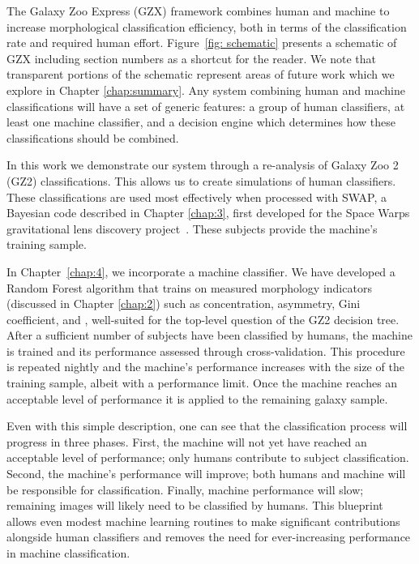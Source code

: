 
The Galaxy Zoo Express (GZX) framework combines human and machine to increase morphological classification efficiency, both in terms of the classification rate and required human effort. Figure~\ref{fig: schematic} presents a schematic of GZX including section numbers as a shortcut for the reader. We note that transparent portions  of the schematic represent areas of future work which we explore in Chapter \ref{chap:summary}. Any system combining human and machine classifications will have a set of generic features: a group of human classifiers, at least one machine classifier, and a decision engine which determines how these classifications should be combined.

In this work we demonstrate our system through a re-analysis of  Galaxy Zoo 2 (GZ2) classifications. This allows us to  create simulations of human classifiers. These classifications are used most effectively when processed with SWAP, a Bayesian code described in Chapter \ref{chap:3}, first developed for the Space Warps gravitational lens discovery project~\citep{Marshall2016}. These subjects provide the machine's training sample. 

In Chapter~\ref{chap:4}, we incorporate a machine classifier. We have developed a Random Forest algorithm that trains on measured morphology indicators (discussed in Chapter \ref{chap:2}) such as concentration, asymmetry, Gini coefficient, and , well-suited for the top-level question of the GZ2 decision tree. After a sufficient number of subjects have been classified by humans, the machine is trained and its performance assessed through cross-validation. This procedure is repeated nightly and the machine's performance increases with the size of the training sample, albeit with a performance limit. Once the machine reaches an acceptable level of performance it is applied to the remaining galaxy sample. 

Even with this simple description, one can see that the classification process will progress in three phases.  First, the machine will not yet have reached an acceptable level of performance; only humans contribute to subject classification. Second, the machine's performance will improve; both humans and machine will be responsible for classification. Finally, machine performance will slow; remaining images will likely need to be classified by humans. This blueprint allows even modest machine learning routines to make significant contributions alongside human classifiers and removes the need for ever-increasing performance in machine classification.